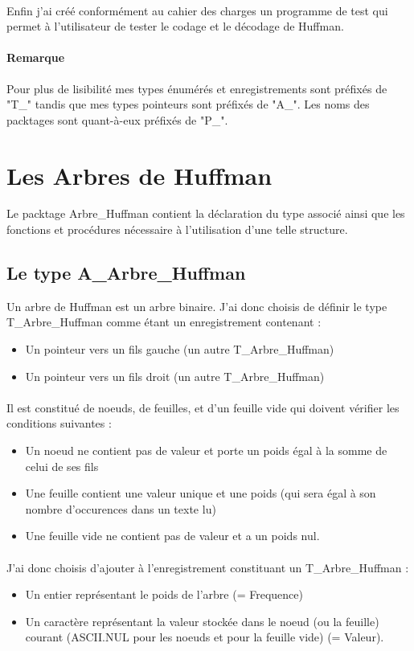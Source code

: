 \documentclass{book}
\begin{document}
\paragraph{}
Enfin j'ai créé conformément au cahier des charges un programme de test qui permet à l'utilisateur de tester le codage et le décodage de Huffman.
\paragraph{Remarque}
Pour plus de lisibilité mes types énumérés et enregistrements sont préfixés de "T\_" tandis que mes types pointeurs sont préfixés de "A\_". Les noms des packtages sont quant-à-eux préfixés de "P\_".
 
\section{Les Arbres de Huffman}
Le packtage Arbre\_Huffman contient la déclaration du type associé ainsi que les fonctions et procédures nécessaire à l'utilisation d'une telle structure.
\subsection{Le type A\_Arbre\_Huffman}
Un arbre de Huffman est un arbre binaire. J'ai donc choisis de définir le type T\_Arbre\_Huffman comme étant un enregistrement contenant :
\begin{itemize}
	\item Un pointeur vers un fils gauche (un autre T\_Arbre\_Huffman)
	\item Un pointeur vers un fils droit (un autre T\_Arbre\_Huffman)
\end{itemize}
\paragraph{}
Il est constitué de noeuds, de feuilles, et d'un feuille vide qui doivent vérifier les conditions suivantes :
\begin{itemize}
	\item Un noeud ne contient pas de valeur et porte un poids égal à la somme de celui de ses fils
	\item Une feuille contient une valeur unique et une poids (qui sera égal à son nombre d'occurences dans un texte lu)
	\item Une feuille vide ne contient pas de valeur et a un poids nul.
\end{itemize}
\paragraph{}
J'ai donc choisis d'ajouter à l'enregistrement constituant un T\_Arbre\_Huffman :
\begin{itemize}
	\item Un entier représentant le poids de l'arbre (= Frequence)
	\item Un caractère représentant la valeur stockée dans le noeud (ou la feuille) courant (ASCII.NUL pour les noeuds et pour la feuille vide) (= Valeur).
\end{itemize}
\end{document}
